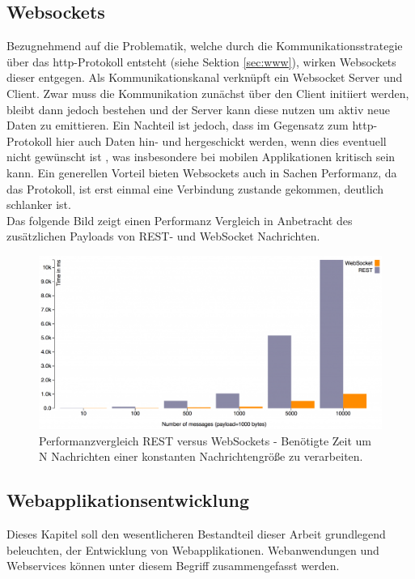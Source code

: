 \subsection{Websockets}\label{sec:websockets}
Bezugnehmend auf die Problematik, welche durch die Kommunikationsstrategie über das http-Protokoll entsteht (siehe Sektion \ref{sec:www}), wirken Websockets dieser entgegen. Als Kommunikationskanal verknüpft ein Websocket Server und Client. Zwar muss die Kommunikation zunächst über den Client initiiert werden, bleibt dann jedoch bestehen und der Server kann diese nutzen um aktiv neue Daten zu emittieren. Ein Nachteil ist jedoch, dass im Gegensatz zum http-Protokoll hier auch Daten hin- und hergeschickt werden, wenn dies eventuell nicht gewünscht ist \cite{neumann2015entwicklung}, was insbesondere bei mobilen Applikationen kritisch sein kann. Ein generellen Vorteil bieten Websockets auch in Sachen Performanz, da das Protokoll, ist erst einmal eine Verbindung zustande gekommen, deutlich schlanker ist. \\ Das folgende Bild zeigt einen Performanz Vergleich in Anbetracht des zusätzlichen Payloads von REST- und WebSocket Nachrichten. 

\begin{figure}[H]
	\centering
	\includegraphics[width=0.8\linewidth]{bilder/websocket-rest-messages}
	\caption[Performanzvergleich REST versus WebSockets]{Performanzvergleich REST versus WebSockets - Benötigte Zeit um N Nachrichten einer konstanten Nachrichtengröße zu verarbeiten. \cite{Gupta2014}}
	\label{fig:socketsrest}
\end{figure}

\subsection{Webapplikationsentwicklung}\label{sec:softwareentwicklung}
Dieses Kapitel soll den wesentlicheren Bestandteil dieser Arbeit grundlegend beleuchten, der Entwicklung von Webapplikationen.
Webanwendungen und Webservices können unter diesem Begriff zusammengefasst werden.
 \\ 
